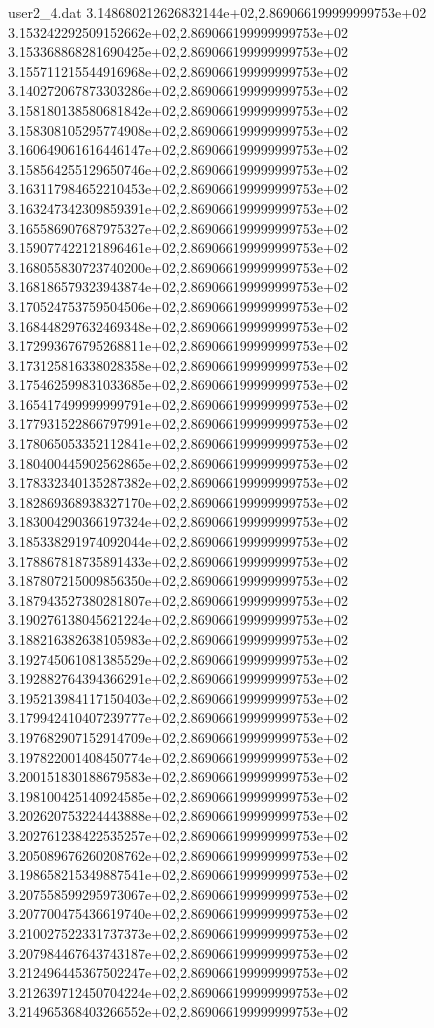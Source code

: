 \begin{filecontents}{user2_4.dat}
3.148680212626832144e+02,2.869066199999999753e+02
3.153242292509152662e+02,2.869066199999999753e+02
3.153368868281690425e+02,2.869066199999999753e+02
3.155711215544916968e+02,2.869066199999999753e+02
3.140272067873303286e+02,2.869066199999999753e+02
3.158180138580681842e+02,2.869066199999999753e+02
3.158308105295774908e+02,2.869066199999999753e+02
3.160649061616446147e+02,2.869066199999999753e+02
3.158564255129650746e+02,2.869066199999999753e+02
3.163117984652210453e+02,2.869066199999999753e+02
3.163247342309859391e+02,2.869066199999999753e+02
3.165586907687975327e+02,2.869066199999999753e+02
3.159077422121896461e+02,2.869066199999999753e+02
3.168055830723740200e+02,2.869066199999999753e+02
3.168186579323943874e+02,2.869066199999999753e+02
3.170524753759504506e+02,2.869066199999999753e+02
3.168448297632469348e+02,2.869066199999999753e+02
3.172993676795268811e+02,2.869066199999999753e+02
3.173125816338028358e+02,2.869066199999999753e+02
3.175462599831033685e+02,2.869066199999999753e+02
3.165417499999999791e+02,2.869066199999999753e+02
3.177931522866797991e+02,2.869066199999999753e+02
3.178065053352112841e+02,2.869066199999999753e+02
3.180400445902562865e+02,2.869066199999999753e+02
3.178332340135287382e+02,2.869066199999999753e+02
3.182869368938327170e+02,2.869066199999999753e+02
3.183004290366197324e+02,2.869066199999999753e+02
3.185338291974092044e+02,2.869066199999999753e+02
3.178867818735891433e+02,2.869066199999999753e+02
3.187807215009856350e+02,2.869066199999999753e+02
3.187943527380281807e+02,2.869066199999999753e+02
3.190276138045621224e+02,2.869066199999999753e+02
3.188216382638105983e+02,2.869066199999999753e+02
3.192745061081385529e+02,2.869066199999999753e+02
3.192882764394366291e+02,2.869066199999999753e+02
3.195213984117150403e+02,2.869066199999999753e+02
3.179942410407239777e+02,2.869066199999999753e+02
3.197682907152914709e+02,2.869066199999999753e+02
3.197822001408450774e+02,2.869066199999999753e+02
3.200151830188679583e+02,2.869066199999999753e+02
3.198100425140924585e+02,2.869066199999999753e+02
3.202620753224443888e+02,2.869066199999999753e+02
3.202761238422535257e+02,2.869066199999999753e+02
3.205089676260208762e+02,2.869066199999999753e+02
3.198658215349887541e+02,2.869066199999999753e+02
3.207558599295973067e+02,2.869066199999999753e+02
3.207700475436619740e+02,2.869066199999999753e+02
3.210027522331737373e+02,2.869066199999999753e+02
3.207984467643743187e+02,2.869066199999999753e+02
3.212496445367502247e+02,2.869066199999999753e+02
3.212639712450704224e+02,2.869066199999999753e+02
3.214965368403266552e+02,2.869066199999999753e+02

\end{filecontents}
